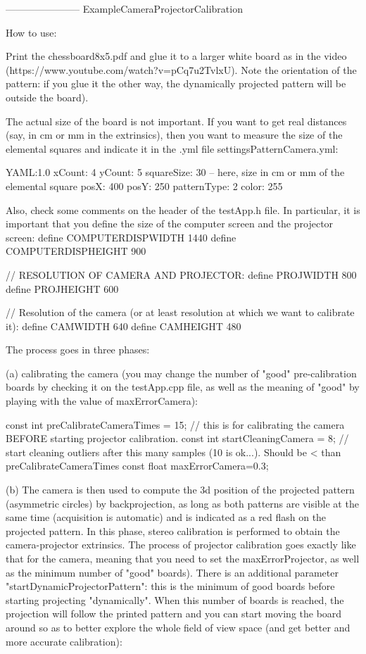 -----------------------
ExampleCameraProjectorCalibration

How to use:

Print the chessboard8x5.pdf and glue it to a larger white board as in the video (https://www.youtube.com/watch?v=pCq7u2TvlxU). Note the orientation of the pattern: if you glue it the other way, the dynamically projected pattern will be outside the board).

The actual size of the board is not important. If you want to get real distances (say, in cm or mm in the extrinsics), then you want to measure the size of the elemental squares and indicate it in the .yml file settingsPatternCamera.yml:

YAML:1.0 xCount: 4 yCount: 5 squareSize: 30 -- here, size in cm or mm of the elemental square posX: 400 posY: 250 patternType: 2 color: 255

Also, check some comments on the header of the testApp.h file. In particular, it is important that you define the size of the computer screen and the projector screen:
define COMPUTERDISPWIDTH 1440
define COMPUTERDISPHEIGHT 900

// RESOLUTION OF CAMERA AND PROJECTOR:
define PROJWIDTH 800
define PROJHEIGHT 600

// Resolution of the camera (or at least resolution at which we want to calibrate it):
define CAMWIDTH 640
define CAMHEIGHT 480

The process goes in three phases:

(a) calibrating the camera (you may change the number of "good" pre-calibration boards by checking it on the testApp.cpp file, as well as the meaning of "good" by playing with the value of maxErrorCamera):

const int preCalibrateCameraTimes = 15; // this is for calibrating the camera BEFORE starting projector calibration. const int startCleaningCamera = 8; // start cleaning outliers after this many samples (10 is ok...). Should be < than preCalibrateCameraTimes const float maxErrorCamera=0.3;

(b) The camera is then used to compute the 3d position of the projected pattern (asymmetric circles) by backprojection, as long as both patterns are visible at the same time (acquisition is automatic) and is indicated as a red flash on the projected pattern. In this phase, stereo calibration is performed to obtain the camera-projector extrinsics. The process of projector calibration goes exactly like that for the camera, meaning that you need to set the maxErrorProjector, as well as the minimum number of "good" boards). There is an additional parameter "startDynamicProjectorPattern": this is the minimum of good boards before starting projecting "dynamically". When this number of boards is reached, the projection will follow the printed pattern and you can start moving the board around so as to better explore the whole field of view space (and get better and more accurate calibration):

